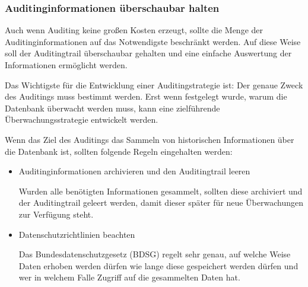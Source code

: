         \subsubsection{Auditinginformationen \"uberschaubar halten}
          Auch wenn Auditing keine gro\ss en Kosten erzeugt, sollte die Menge der Auditinginformationen auf das Notwendigste beschr\"ankt werden. Auf diese Weise soll der Auditingtrail \"uberschaubar gehalten und eine einfache Auswertung der Informationen erm\"oglicht werden.

          Das Wichtigste f\"ur die Entwicklung einer Auditingstrategie ist: Der genaue Zweck des Auditings muss bestimmt werden. Erst wenn festgelegt wurde, warum die Datenbank \"uberwacht werden muss, kann eine zielf\"uhrende \"Uberwachungsstrategie entwickelt werden.

          Wenn das Ziel des Auditings das Sammeln von historischen Informationen \"uber die Datenbank ist, sollten folgende Regeln eingehalten werden:
          \begin{itemize}
            \item Auditinginformationen archivieren und den Auditingtrail leeren

              Wurden alle ben\"otigten Informationen gesammelt, sollten diese archiviert und der Auditingtrail geleert werden, damit dieser sp\"ater f\"ur neue \"Uberwachungen zur Ver\-f\"u\-gung steht.
            \item Datenschutzrichtlinien beachten
            
              Das Bundesdatenschutzgesetz (BDSG) regelt sehr genau, auf welche
              Weise Daten erhoben werden dürfen wie lange diese gespeichert
              werden dürfen und wer in welchem Falle Zugriff auf die gesammelten
              Daten hat.
          \end{itemize}
